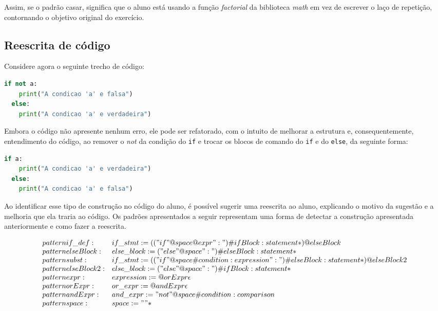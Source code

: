 \documentclass[12pt]{article}
\begin{document}
Assim, se o padrão casar, significa que o aluno está usando a função 
\textit{factorial} da biblioteca \textit{math} em vez de escrever o laço de
repetição, contornando o objetivo original do exercício.

\subsection{Reescrita de código}

Considere agora o seguinte trecho de código:

\begin{lstlisting}[language=Python]
  if not a:
    print("A condicao 'a' e falsa")
  else:
    print("A condicao 'a' e verdadeira")
\end{lstlisting}

Embora o código não apresente nenhum erro, ele pode ser refatorado, com o intuito 
de melhorar a estrutura e, consequentemente, entendimento do código, ao remover o 
\textit{not} da condição do \texttt{if} e trocar os blocos de comando do 
\texttt{if} e do \texttt{else}, da seguinte forma:

\begin{lstlisting}[language=Python]
  if a:
    print("A condicao 'a' e verdadeira")
  else:
    print("A condicao 'a' e falsa")
\end{lstlisting}

Ao identificar esse tipo de construção no código do aluno, é possível sugerir
uma reescrita ao aluno, explicando o motivo da sugestão e a melhoria que ela
traria ao código. Os padrões apresentados a seguir representam uma forma de
detectar a construção apresentada anteriormente e como fazer a reescrita.

\[
  \begin{array}{ll}
    pattern if\_def : & if\_stmt := (("if" @space @expr ":") \#ifBlock:statement*) @elseBlock \\
    pattern elseBlock : & else\_block := ("else" @space ":") \#elseBlock:statement* \\
  
    pattern subst : & if\_stmt := (("if" @space \#condition:expression ":") \#elseBlock:statement*) @elseBlock2 \\
    pattern elseBlock2 : & else\_block := ("else" @space ":") \#ifBlock:statement* \\
  
    pattern expr    : & expression := @orExpr \epsilon \\
    pattern orExpr  : & or\_expr    := @andExpr \epsilon \\
    pattern andExpr : & and\_expr   := "not" @space \#condition:comparison \\
  
    pattern space : & space := " "*
  \end{array}
\]
\end{document}
